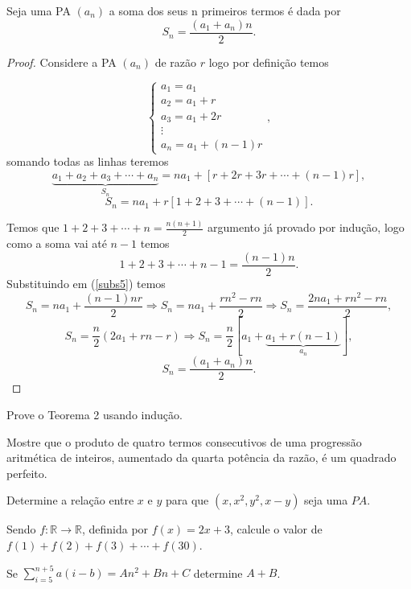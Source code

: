\begin{teo}
\label{teosoma}
Seja uma PA $(a_n)$ a soma dos seus n primeiros termos é dada por
\begin{equation}
    S_n = \frac{(a_1+a_n)n}{2}.
\end{equation}
\end{teo}
\begin{proof}
Considere a PA $(a_n)$ de razão $r$ logo por definição temos

\begin{equation}
    \begin{cases}
    a_1 = a_1\\
    a_2 = a_1 + r\\
    a_3 = a_1 + 2r\\
    \vdots\\
    a_n = a_1 + (n-1)r 
    \end{cases},
\end{equation}
somando todas as linhas teremos
$$\underbrace{a_1 + a_2 + a_3 + \cdots + a_n}_{S_n} = na_1 + [r+ 2r + 3r + \cdots + (n-1)r],$$
\begin{equation}
    \label{subs5}
    S_n = na_1 + r[1+2+3+\cdots+(n-1)].
\end{equation}

Temos que $1+2+3+\cdots+n = \frac{n(n+1)}{2}$ argumento já provado por indução, logo como a soma vai até $n-1$ temos 
$$1+2+3+\cdots+n-1 = \frac{(n-1)n}{2}.$$
\inic Substituindo em (\ref{subs5}) temos
$$ S_n = na_1 + \frac{(n-1)nr}{2}\Rightarrow S_n = na_1 + \frac{rn^2-rn}{2} \Rightarrow S_n = \frac{2na_1 + rn^2-rn}{2},$$
$$ S_n = \frac{n}{2}(2a_1 + rn-r) \Rightarrow S_n = \frac{n}{2}[a_1 + \underbrace{a_1 +  r(n-1)}_{a_n}], $$
$$S_n = \frac{(a_1 + a_n)n}{2}.$$
\end{proof}

\noindent \exercicio

\noindent [1] Prove o Teorema 2 usando indução.

\noindent [2] Mostre que o produto de quatro termos consecutivos de uma progressão aritmética de inteiros, aumentado da quarta potência da razão, é um quadrado perfeito.

\noindent [3] Determine a relação entre $x$ e $y$ para que  $(x,x^2,y^2,x-y)$ seja uma $PA$.

\noindent [4] Sendo $f:\mathbb{R} \rightarrow \mathbb{R}$, definida por $f(x) = 2x+3$, calcule o valor de $f(1) + f(2) + f(3) + \cdots + f(30)$.

\noindent [5] Se $\displaystyle \sum_{i=5}^{n+5}a(i-b) = An^2 + Bn + C$ determine $A+B$.

